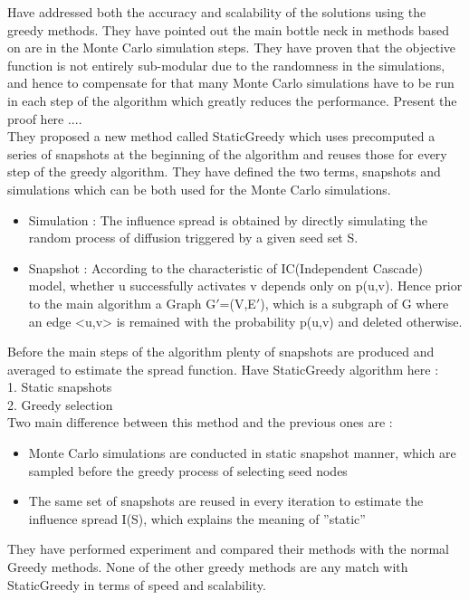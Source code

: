 \documentclass[english]{tktltiki}
\begin{document}
\cite{cheng13} Have addressed both the accuracy and scalability of the solutions using the greedy methods. They have pointed out the main bottle neck in methods based on \cite{kempe03} are in the Monte Carlo simulation steps. They have proven that the objective function is not entirely sub-modular due to the randomness in the simulations, and hence to compensate for that many Monte Carlo simulations have to be run in each step of the algorithm which greatly reduces the performance. Present the proof here ....\\
They proposed a new method called StaticGreedy which uses precomputed a series of snapshots at the beginning of the algorithm and reuses those for every step of the greedy algorithm.  They have defined the two terms, snapshots and simulations which can be both used for the Monte Carlo simulations. \\
\begin{itemize}
\item 
Simulation : The influence spread is obtained by directly simulating the random process of diffusion triggered by a given seed set S.
\item
Snapshot : According to the characteristic of IC(Independent Cascade) model, whether u successfully activates v depends only on p(u,v). Hence prior to the main algorithm a Graph G$'$=(V,E$'$), which is a subgraph of G where an edge <u,v> is remained with the probability p(u,v) and deleted otherwise. 
\end{itemize}
Before the main steps of the algorithm plenty of snapshots are produced and averaged to estimate the spread function. 
Have StaticGreedy algorithm here :\\
1. Static snapshots \\
2. Greedy selection \\

Two main difference between this method and the previous ones are :
\begin{itemize}
\item
Monte Carlo simulations are conducted in static snapshot manner, which are sampled before the greedy process of selecting seed nodes
\item
The same set of snapshots are reused in every iteration to estimate the influence spread I(S), which explains the meaning of ''static''
\end{itemize}

They have performed experiment and compared their methods with the normal Greedy methods. None of the other greedy methods are any match with StaticGreedy in terms of speed and scalability. 
\end{document}
